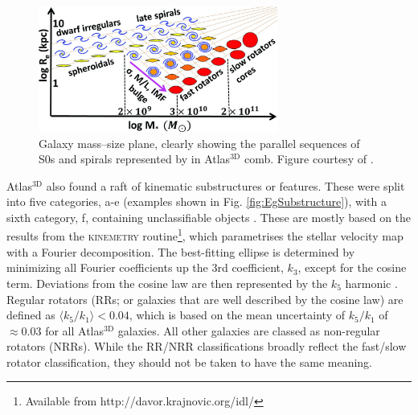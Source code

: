 	\begin{figure}
		\centering
		\includegraphics[width=0.7\textwidth]{introduction/mass_Re.jpg}
		\caption[The galaxy mass--size plane]{Galaxy mass--size plane, clearly showing the parallel sequences of S0s and spirals represented by in Atlas$^\text{3D}$ comb. Figure courtesy of \citet{Cappellari2013a}.}
		\label{fig:MassRe}
	\end{figure}

	Atlas$^\text{3D}$ also found a raft of kinematic substructures or features. These were split into five categories, a-e (examples shown in Fig. \ref{fig:EgSubstructure}), with a sixth category, f, containing unclassifiable objects \citep{Krajnovic2011}. These are mostly based on the results from the \textsc{kinemetry} routine\footnote{Available from http://davor.krajnovic.org/idl/}\citep{Krajnovic2006}, which parametrises the stellar velocity map with a Fourier decomposition. The best-fitting ellipse is determined by minimizing all Fourier coefficients up the 3rd coefficient, $k_3$, except for the cosine term. Deviations from the cosine law are then represented by the $k_5$ harmonic \citep{Krajnovic2006}. Regular rotators (RRs; or galaxies that are well described by the cosine law) are defined as $\langle k_5/k_1 \rangle < 0.04$, which is based on the mean uncertainty of $k_5/k_1$ of $\approx 0.03$ for all Atlas$^\text{3D}$ galaxies. All other galaxies are classed as non-regular rotators (NRRs). While the RR/NRR classifications broadly reflect the fast/slow rotator classification, they should not be taken to have the same meaning. 

